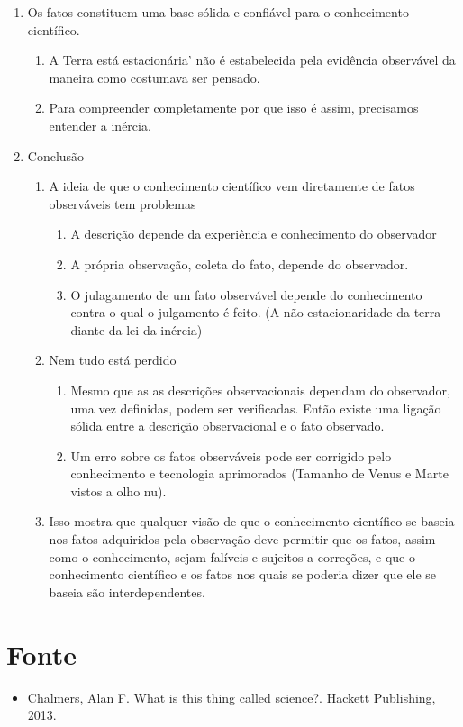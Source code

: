 \documentclass{article}
\begin{document}
\begin{enumerate}
\begin{enumerate}
    \end{enumerate}
    \item Os fatos constituem uma base sólida e confiável para o conhecimento científico.
    \begin{enumerate}
        \item A Terra está estacionária' não é estabelecida pela evidência observável da maneira como costumava ser pensado.
        \item Para compreender completamente por que isso é assim, precisamos entender a inércia.
    \end{enumerate}
    \item Conclusão
    \begin{enumerate}
        \item A ideia de que o conhecimento científico vem diretamente de fatos observáveis tem problemas
        \begin{enumerate}
            \item A descrição depende da experiência e conhecimento do observador
            \item A própria observação, coleta do fato, depende do observador.
            \item O julagamento de um fato observável depende do conhecimento contra o qual o julgamento é feito. (A não estacionaridade da terra diante da lei da inércia)
        \end{enumerate}
        \item Nem tudo está perdido
        \begin{enumerate}
            \item Mesmo que as as descrições observacionais dependam do observador, uma vez definidas, podem ser verificadas. Então existe uma ligação sólida entre a descrição observacional e o fato observado.
            \item Um erro sobre os fatos observáveis pode ser corrigido pelo conhecimento e tecnologia aprimorados (Tamanho de Venus e Marte vistos a olho nu).
        \end{enumerate}
        \item Isso mostra que qualquer visão de que o conhecimento científico se baseia nos fatos adquiridos pela observação deve permitir que os fatos, assim como o conhecimento, sejam falíveis e sujeitos a correções, e que o conhecimento científico e os fatos nos quais se poderia dizer que ele se baseia são interdependentes.
    \end{enumerate}
\end{enumerate}

\section*{Fonte}

\begin{itemize}
    \item Chalmers, Alan F. What is this thing called science?. Hackett Publishing, 2013.
\end{itemize}

%
%
\end{document}
